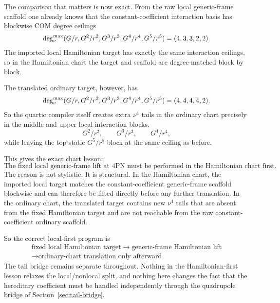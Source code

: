 \documentclass[11pt]{article}
\begin{document}
The comparison that matters is now exact.  From the raw local generic-frame
scaffold one already knows that the constant-coefficient interaction basis has
blockwise COM degree ceilings
\begin{equation}
\deg_{\nu}^{\rm max}(G/r,G^2/r^2,G^3/r^3,G^4/r^4,G^5/r^5)
=
(4,3,3,2,2).
\label{eq:app-local-target-scaffold-degree-ceilings}
\end{equation}
The imported local Hamiltonian target has exactly the same interaction ceilings,
so in the Hamiltonian chart the target and scaffold are degree-matched block by
block.

The translated ordinary target, however, has
\begin{equation}
\deg_{\nu}^{\rm max}(G/r,G^2/r^2,G^3/r^3,G^4/r^4,G^5/r^5)
=
(4,4,4,4,2).
\label{eq:app-local-target-ordinary-degree-ceilings}
\end{equation}
So the quartic compiler itself creates extra \(\nu^4\) tails in the ordinary
chart precisely in the middle and upper local interaction blocks,
\begin{equation}
G^2/r^2,
\qquad
G^3/r^3,
\qquad
G^4/r^4,
\label{eq:app-local-target-ordinary-extra-tail-blocks}
\end{equation}
while leaving the top static \(G^5/r^5\) block at the same ceiling as before.

This gives the exact chart lesson:
\begin{equation}
\boxed{
\text{The fixed local generic-frame lift at }4\text{PN must be performed in the Hamiltonian chart first.}
}
\label{eq:app-local-target-hamiltonian-first-lesson}
\end{equation}
The reason is not stylistic.  It is structural.  In the Hamiltonian chart, the
imported local target matches the constant-coefficient generic-frame scaffold
blockwise and can therefore be lifted directly before any further translation.
In the ordinary chart, the translated target contains new \(\nu^4\) tails that
are absent from the fixed Hamiltonian target and are not reachable from the raw
constant-coefficient ordinary scaffold.

So the correct local-first program is
\begin{equation}
\boxed{
\begin{gathered}
\text{fixed local Hamiltonian target}
\;\longrightarrow\;
\text{generic-frame Hamiltonian lift}
\\
\longrightarrow
\text{ordinary-chart translation only afterward}
\end{gathered}
}
\label{eq:app-local-target-correct-program-order}
\end{equation}
The tail bridge remains separate throughout.  Nothing in the Hamiltonian-first
lesson relaxes the local/nonlocal split, and nothing here changes the fact that
the hereditary coefficient must be handled independently through the quadrupole
bridge of Section~\ref{sec:tail-bridge}.
\end{document}
